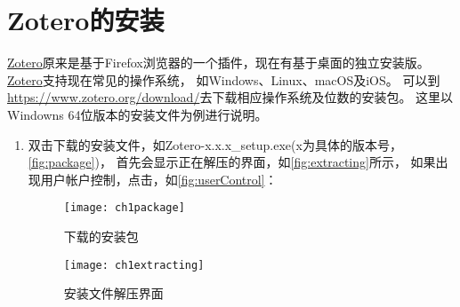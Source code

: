 \documentclass[theorem=false,mathfont=none,openany,sub3section]{easybook}
\begin{document}
\section{Zotero的安装}
\href{https://www.zotero.org/}{Zotero}原来是基于Firefox浏览器的一个插件，现在有基于桌面的独立安装版。\href{https://www.zotero.org/}{Zotero}支持现在常见的操作系统，
如Windows、Linux、macOS及iOS。
可以到\url{https://www.zotero.org/download/}去下载相应操作系统及位数的安装包。
这里以Windowns 64位版本的安装文件为例进行说明。
\begin{enumerate}
  \item 双击下载的安装文件，如Zotero-x.x.x\_setup.exe(x为具体的版本号，\autoref{fig:package})，
        首先会显示正在解压的界面，如\autoref{fig:extracting}所示，
        如果出现用户帐户控制，点击，如\autoref{fig:userControl}：
        \begin{figure}[htbp]
          \centering
          \begin{minipage}[t]{\dimexpr0.5\textwidth-4em}
            \centering
            \texttt{[image: ch1package]}
            \caption{下载的安装包}
            \label{fig:package}
          \end{minipage}
          \begin{minipage}[t]{\dimexpr0.5\textwidth-4em}
            \centering
            \texttt{[image: ch1extracting]}
            \caption{安装文件解压界面}
            \label{fig:extracting}
          \end{minipage}
        \end{figure}


\end{enumerate}
\end{document}
